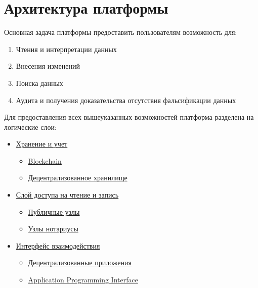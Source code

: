 \documentclass[12pt]{report}
\begin{document}
\section{Архитектура платформы}
\label{tech-arch}
\begin{multicols}{2}
Основная задача платформы предоставить пользователям возможность для:
\begin{enumerate}
\item Чтения и интерпретации данных 
\item Внесения изменений
\item Поиска данных
\item Аудита и получения доказательства отсутствия фальсификации данных
\end{enumerate}
Для предоставления всех вышеуказанных возможностей платформа разделена на логические слои: 
\begin{itemize}
	\item \hyperref[tech-arch-underlayer]{Хранение и учет}
	\begin{itemize}
		\item \hyperref[tech-blockchain]{Blockchain}
		\item \hyperref[tech-storage]{Децентрализованное хранилище}
	\end{itemize}
	\item \hyperref[tech-arch-connect]{Слой доступа на чтение и запись}
	\begin{itemize}
		\item \hyperref[tech-arch-connect-nodes]{Публичные узлы}
		\item \hyperref[tech-arch-connect-validators]{Узлы нотариусы}
	\end{itemize}
	\item \hyperref[tech-arch-interfaces]{Интерфейс взаимодействия}
	\begin{itemize}
		\item \hyperref[tech-arch-interfaces-dapp]{Децентрализованные приложения}
		\item \hyperref[tech-arch-interfaces-api]{Application Programming Interface}
	\end{itemize}
\end{itemize}
\end{multicols}

\def\Interface{Интерфейс взаимодействия}
\def\Connect{Слой доступа}
\def\Underlayer{Слой хранения и учета}

\def\DApps{Децентрализованные приложения}
\def\Api{API}
\def\Requests{Прямые запросы}
\end{document}
